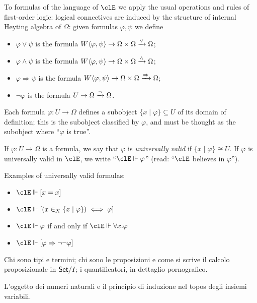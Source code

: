 To formulas of the language of $\clE$ we apply the usual operations and rules of first-order logic: logical connectives are induced by the structure of internal Heyting algebra of $\Omega$: given formulas $\varphi,\psi$ we define
\begin{itemize}
  \item $\varphi\lor \psi$ is the formula $W\langle \varphi,\psi\rangle \to \Omega\times \Omega \xrightarrow{\lor} \Omega$;
  \item $\varphi\land\psi$ is the formula $W\langle \varphi,\psi\rangle \to \Omega\times \Omega \xrightarrow{\land} \Omega$;
  \item $\varphi\Rightarrow\psi$ is the formula $W\langle \varphi,\psi\rangle \to \Omega\times \Omega \xrightarrow{\Rightarrow} \Omega$;
  \item $\lnot\varphi$ is the formula $U \to \Omega \xrightarrow{\lnot} \Omega$.
\end{itemize}
Each formula $\varphi : U \to \Omega$ defines a subobject $\{x\mid \varphi\} \subseteq U$ of its domain of definition; this is the subobject classified by $\varphi$, and must be thought as the subobject where ``$\varphi$ is true''.

If $\varphi : U\to\Omega$ is a formula, we say that $\varphi$ is \emph{universally valid} if $\{x\mid\varphi\}\cong U$. If $\varphi$ is universally valid in $\clE$, we write ``$\clE\Vdash \varphi$'' (read: ``$\clE$ believes in $\varphi$'').

Examples of universally valid formulas:
\begin{itemize}
  \item $\clE\Vdash [x=x]$
  \item $\clE\Vdash [(x \in_X \{x\mid\varphi\}) \iff \varphi]$
  \item $\clE\Vdash \varphi$ if and only if $\clE \Vdash \forall x.\varphi$
  \item $\clE\Vdash [\varphi \Rightarrow \lnot\lnot\varphi]$
\end{itemize}
Chi sono tipi e termini; chi sono le proposizioni e come si scrive il calcolo proposizionale in $\mathsf{Set}/I$; i quantificatori, in dettaglio pornografico.

L'oggetto dei numeri naturali e il principio di induzione nel topos degli insiemi variabili.
